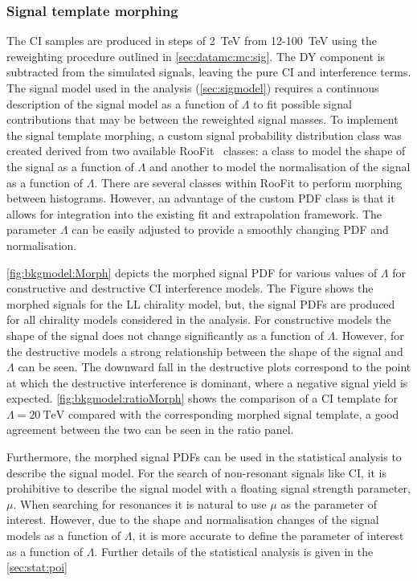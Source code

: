 \subsubsection{Signal template morphing}\label{sec:datamc:mc:sig:morphing}
The CI samples are produced in steps of \SI{2}{\tera\electronvolt} from 12-\SI{100} {\tera\electronvolt} using the reweighting procedure outlined in \cref{sec:datamc:mc:sig}. The DY component is subtracted from the simulated signals, leaving the pure CI and interference terms. The signal model used in the analysis (\cref{sec:sigmodel}) requires a continuous description of the signal model as a function of $\Lambda$ to fit possible signal contributions that may be between the reweighted signal masses. To implement the signal template morphing, a custom signal probability distribution class was created derived from two available RooFit~\cite{RooFit} classes: a class to model the shape of the signal as a function of $\Lambda$ and another to model the normalisation of the signal as a function of $\Lambda$. There are several classes within RooFit to perform morphing between histograms. However, an advantage of the custom PDF class is that it allows for integration into the existing fit and extrapolation framework. The parameter $\Lambda$ can be easily adjusted to provide a smoothly changing PDF and normalisation. 

\cref{fig:bkgmodel:Morph} depicts the morphed signal PDF for various values of $\Lambda$ for constructive and destructive CI interference models. The Figure shows the morphed signals for the LL chirality model, but, the signal PDFs are produced for all chirality models considered in the analysis. For constructive models the shape of the signal does not change significantly as a function of $\Lambda$. However, for the destructive models a strong relationship between the shape of the signal and $\Lambda$ can be seen. The downward fall in the destructive plots correspond to the point at which the destructive interference is dominant, where a negative signal yield is expected. \cref{fig:bkgmodel:ratioMorph} shows the comparison of a CI template for $\Lambda = \SI{20}{\tera\electronvolt}$ compared with the corresponding morphed signal template, a good agreement between the two can be seen in the ratio panel. 

Furthermore, the morphed signal PDFs can be used in the statistical analysis to describe the signal model. For the search of non-resonant signals like CI, it is prohibitive to describe the signal model with a floating signal strength parameter, $\mu$. When searching for resonances it is natural to use $\mu$ as the parameter of interest. However, due to the shape and normalisation changes of the signal models as a function of $\Lambda$, it is more accurate to define the parameter of interest as a function of $\Lambda$. Further details of the statistical analysis is given in the \cref{sec:stat:poi}


